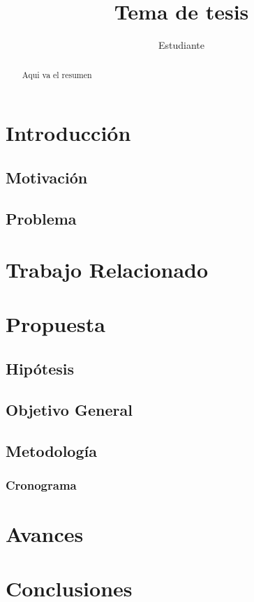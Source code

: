 \documentclass[]{report}
\title{Tema de tesis}
\author{Estudiante}
\begin{document}
	

	

\newpage\null\thispagestyle{empty}\newpage
	

\begin{abstract}
	Aqui va el resumen 
\end{abstract}

\newpage\null\thispagestyle{empty}\newpage

\tableofcontents

\chapter{Introducción}
\section{Motivación}
\section{Problema}

\chapter{Trabajo Relacionado}

\chapter{Propuesta}

\section{Hipótesis}
\section{Objetivo General}
\section{Metodología}
\subsection{Cronograma}

\chapter{Avances}

\chapter{Conclusiones}
\end{document}
